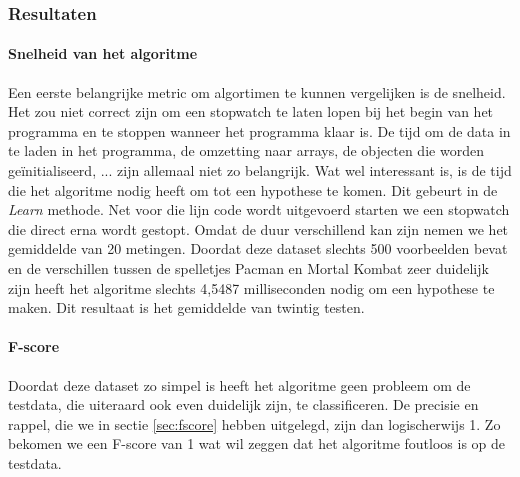 \subsubsection{Resultaten}
\paragraph{Snelheid van het algoritme} 
Een eerste belangrijke metric om algortimen te kunnen vergelijken is de snelheid. Het zou niet correct zijn om een stopwatch te laten lopen bij het begin van het programma en te stoppen wanneer het programma klaar is. De tijd om de data in te laden in het programma, de omzetting naar arrays, de objecten die worden geïnitialiseerd, ... zijn allemaal niet zo belangrijk. Wat wel interessant is, is de tijd die het algoritme nodig heeft om tot een hypothese te komen. Dit gebeurt in de \textit{Learn} methode. 
Net voor die lijn code wordt uitgevoerd starten we een stopwatch die direct erna wordt gestopt. Omdat de duur verschillend kan zijn nemen we het gemiddelde van 20 metingen. 
Doordat deze dataset slechts 500 voorbeelden bevat en de verschillen tussen de spelletjes Pacman en Mortal Kombat zeer duidelijk zijn heeft het algoritme slechts 4,5487 milliseconden nodig om een hypothese te maken. Dit resultaat is het gemiddelde van twintig testen. 
\paragraph{F-score} 

Doordat deze dataset zo simpel is  heeft het algoritme geen probleem om de testdata, die uiteraard ook even duidelijk zijn, te classificeren. De precisie en rappel, die we in sectie \ref{sec:fscore} hebben uitgelegd, zijn dan logischerwijs 1.
Zo bekomen we een F-score van 1 wat wil zeggen dat het algoritme foutloos is op de testdata.  



